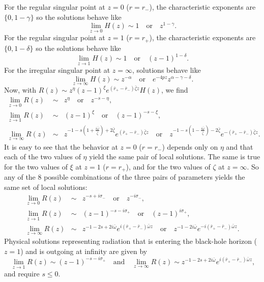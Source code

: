 \documentclass[11pt]{article}
\begin{document}
For the regular singular point at $z=0$ ($r=r_\minus$), the
characteristic exponents are $\{0,1-\gamma\}$ so the solutions behave
like
\begin{equation}
  \lim_{z\to0}H(z)\sim1 \quad\mbox{or}\quad z^{1-\gamma}.
\end{equation}
For the regular singular point at $z=1$ ($r=r_+$), the characteristic
exponents are $\{0,1-\delta\}$ so the solutions behave like
\begin{equation}
  \lim_{z\to1}H(z)\sim1 \quad\mbox{or}\quad (z-1)^{1-\delta}.
\end{equation}
For the irregular singular point at $z=\infty$, solutions behave like
\begin{equation}
  \lim_{z\to\infty}H(z)\sim z^{-\alpha} \quad\mbox{or}\quad 
  e^{-4pz}z^{\alpha-\gamma-\delta}.
\end{equation}
Now, with $R(z)\sim z^\eta(z-1)^\xi e^{(\bar{r}_+-\bar{r}_\minus)\bar\zeta z}H(z)$, we
find
\begin{eqnarray}
  \lim_{z\to0}R(z)&\sim& z^\eta \quad\mbox{or}\quad z^{-s-\eta}, \\
  \lim_{z\to1}R(z)&\sim& (z-1)^\xi \quad\mbox{or}\quad (z-1)^{-s-\xi},\\
  \lim_{z\to\infty}R(z)&\sim& 
z^{-1-s(1+\frac{i\bar\omega}{\bar\zeta})+2\bar\zeta}e^{(\bar{r}_+-\bar{r}_\minus)\bar\zeta z} 
\quad\mbox{or}\quad 
z^{-1-s(1-\frac{i\bar\omega}{\bar\zeta})-2\bar\zeta}e^{-(\bar{r}_+-\bar{r}_\minus)\bar\zeta z}.
\end{eqnarray}
It is easy to see that the behavior at $z=0$ ($r=r_\minus$) depends
only on $\eta$ and that each of the two values of $\eta$ yield the
same pair of local solutions.  The same is true for the two values of
$\xi$ at $z=1$ ($r=r_+$), and for the two values of $\zeta$ at
$z=\infty$.  So any of the 8 possible combinations of the three pairs
of parameters yields the same set of local solutions:
\begin{eqnarray}
  \lim_{z\to0}R(z)&\sim& z^{-s+i\sigma_\minus} \quad\mbox{or}\quad z^{-i\sigma_\minus}, \\
  \lim_{z\to1}R(z)&\sim& (z-1)^{-s-i\sigma_+} \quad\mbox{or}\quad (z-1)^{i\sigma_+},\\
  \lim_{z\to\infty}R(z)&\sim& 
z^{-1-2s+2i\bar\omega}e^{i(\bar{r}_+-\bar{r}_\minus)\bar\omega z} 
\quad\mbox{or}\quad 
z^{-1-2i\bar\omega}e^{-i(\bar{r}_+-\bar{r}_\minus)\bar\omega z}.
\end{eqnarray}
Physical solutions representing radiation that is entering the black-hole
horizon ($z=1$) and is outgoing at infinity are given by
\begin{equation}\
  \lim_{z\to1}R(z)\sim (z-1)^{-s-i\sigma_+} \quad\mbox{and}\quad
  \lim_{z\to\infty}R(z)\sim 
  z^{-1-2s+2i\bar\omega}e^{i(\bar{r}_+-\bar{r}_\minus)\bar\omega z},
\end{equation}
and require $s\le0$.
\end{document}
